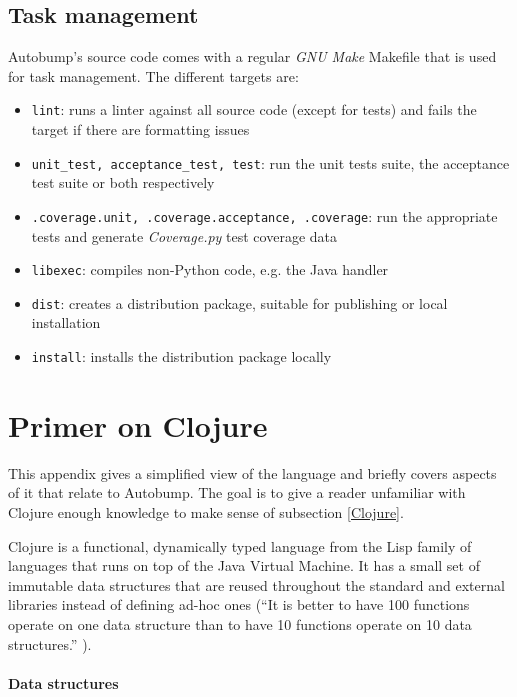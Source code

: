 \documentclass{l4proj}
\newcommand\genericstyle{\lstset{basicstyle=\ttm}}
\newcommand\codeinline[1]{{\genericstyle\lstinline!#1!}}
\begin{document}
\begin{appendices}
\section{Task management}

Autobump's source code comes with a regular \textit{GNU Make} Makefile
that is used for task management. The different targets are:

\begin{itemize}
\item \codeinline{lint}: runs a linter against all source code (except
for tests) and fails the target if there are formatting issues
\item \codeinline{unit_test, acceptance_test, test}: run the unit
tests suite, the acceptance test suite or both respectively
\item \codeinline{.coverage.unit, .coverage.acceptance, .coverage}:
run the appropriate tests and generate \textit{Coverage.py}
\cite{Coverage} test coverage data
\item \codeinline{libexec}: compiles non-Python code, e.g. the Java handler
\item \codeinline{dist}: creates a distribution package, suitable for
publishing or local installation
\item \codeinline{install}: installs the distribution package locally
\end{itemize}

\chapter{Primer on Clojure}
\label{ClojurePrimer}

This appendix gives a simplified view of the language and briefly
covers aspects of it that relate to Autobump. The goal is to give a
reader unfamiliar with Clojure enough knowledge to make sense of
subsection \ref{Clojure}.

Clojure is a functional, dynamically typed language from the Lisp
family of languages that runs on top of the Java Virtual Machine. It
has a small set of immutable data structures that are reused
throughout the standard and external libraries instead of defining
ad-hoc ones (``It is better to have 100 functions operate on one data
structure than to have 10 functions operate on 10 data
structures.'' \cite{ClojureRationale}).

\subsubsection{Data structures}


\end{appendices}
\end{document}
